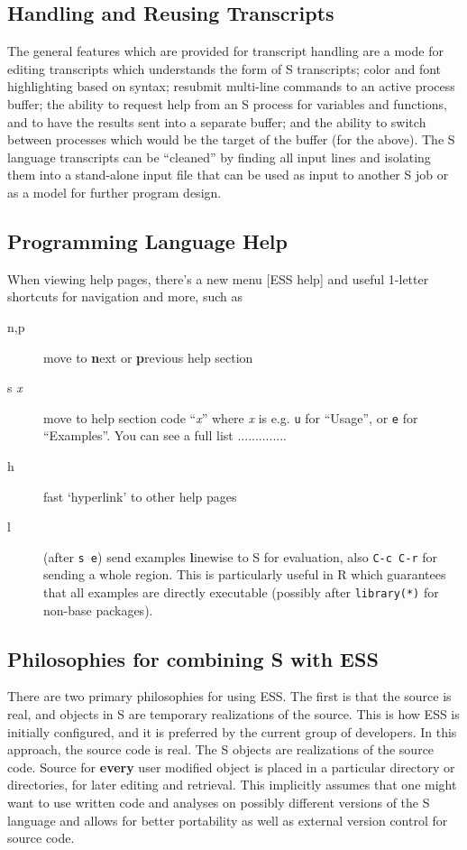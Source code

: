 \documentclass{article}
\begin{document}
\subsection{Handling and Reusing Transcripts}
\label{sec:S:trans}

The general features which are provided for transcript handling are a
mode for editing transcripts which understands the form of S
transcripts; color and font highlighting based on syntax; resubmit
multi-line commands to an active process buffer; the ability to
request help from an S process for variables and functions, and to
have the results sent into a separate buffer; and the ability to
switch between processes which would be the target of the buffer (for
the above).  The S language transcripts can be ``cleaned'' by
finding all input lines and isolating them into a stand-alone input file
that can be used as input to another S job or as a model for further
program design.

\subsection{Programming Language Help}
\label{sec:S:help}

When viewing help pages, there's a new menu \textsf{[ESS help]} and
useful 1-letter shortcuts for navigation and more, such as
\begin{description}
\item[n,p] move to \textbf{n}ext or \textbf{p}revious help section
\item[s \textit{x}] move to help section code ``\textit{x}'' where
  \textit{x} is e.g. \texttt{u} for ``Usage'', or \texttt{e} for
  ``Examples''.  You can see a full list ..............
\item[h] fast `hyperlink' to other help pages
\item[l] (after \texttt{s e}) send examples \textbf{l}inewise to S for
  evaluation, also \texttt{C-c C-r} for sending a whole region.  This 
  is particularly useful in R which guarantees that all examples are
  directly executable (possibly after \texttt{library(*)} for non-base
  packages).
\end{description}

\subsection{Philosophies for combining S with ESS}
\label{sec:S:philosophy}

There are two primary philosophies for using ESS.  The first is that
the source is real, and objects in S are temporary realizations of the
source.  This is how ESS is initially configured, and it is preferred
by the current group of developers.  In this approach, the source code
is real.  The S objects are realizations of the source code.  Source
for \textbf{every} user modified object is placed in a particular
directory or directories, for later editing and retrieval.  This
implicitly assumes that one might want to use written code and
analyses on possibly different versions of the S language and allows
for better portability as well as external version control for source
code.
\end{document}
